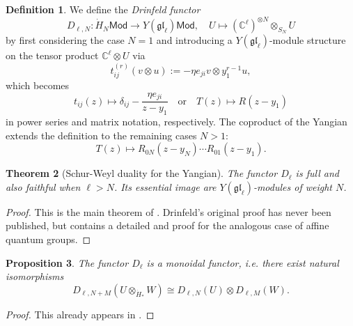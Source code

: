 \documentclass[11pt]{report}
\newtheorem{theorem}{Theorem}[section]
\newtheorem{prop}[theorem]{Proposition}
\theoremstyle{definition}
\newtheorem{definition}[theorem]{Definition}
\theoremstyle{remark}
\theoremstyle{remark}
\newcommand{\C}{\mathbb{C}}
\begin{document}
\begin{definition}
We define the \emph{Drinfeld functor}
\begin{equation*}
D_{\ell,N}: \dot H_N\mathsf{Mod} \to Y(\mathfrak{gl}_\ell)\mathsf{Mod}, \quad U \mapsto (\C^\ell)^{\otimes N} \otimes_{S_N} U
\end{equation*}
by first considering the case $N=1$ and introducing a $Y(\mathfrak{gl}_\ell)$-module structure on the tensor product $\C^\ell \otimes U$ via
\begin{equation*}
t_{ij}^{(r)}(v \otimes u) := -\eta e_{ji} v \otimes y_1^{r-1} u,
\end{equation*}
which becomes
\begin{equation*}
t_{ij}(z) \mapsto \delta_{ij} - \frac{\eta e_{ji}}{z-y_1} \quad \text{or} \quad T(z) \mapsto R(z-y_1)
\end{equation*}
in power series and matrix notation, respectively. The coproduct of the Yangian extends the definition to the remaining cases $N > 1$:
\begin{equation*}
T(z) \mapsto R_{0N}(z-y_N) \cdots R_{01}(z-y_1).
\end{equation*}
\end{definition}

\begin{theorem}[Schur-Weyl duality for the Yangian]
The functor $D_\ell$ is full and also faithful when $\ell > N$. Its essential image are $Y(\mathfrak{gl}_\ell)$-modules of weight $N$.
\end{theorem}

\begin{proof}
This is the main theorem of \cite{article:drinfeld:1986}. Drinfeld's original proof has never been published, but \cite{article:chari:1995} contains a detailed and proof for the analogous case of affine quantum groups.
\end{proof}

\begin{prop}
The functor $D_\ell$ is a monoidal functor, \emph{i.e.} there exist natural isomorphisms
\begin{equation*}
D_{\ell,N+M}(U \otimes_{\dot H_*} W) \cong D_{\ell,N}(U) \otimes D_{\ell,M}(W).
\end{equation*}
\end{prop}

\begin{proof}
This already appears in \cite{article:drinfeld:1986}.
\end{proof}
\end{document}
